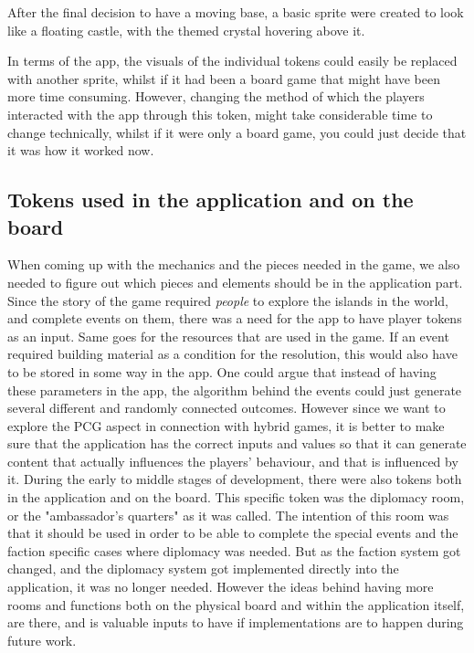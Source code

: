 After the final decision to have a moving base, a basic sprite were created to look like a floating castle, with the themed crystal hovering above it.

In terms of the app, the visuals of the individual tokens could easily be replaced with another sprite, whilst if it had been a board game that might have been more time consuming.
However, changing the method of which the players interacted with the app through this token, might take considerable time to change technically, whilst if it were only a board game, you could just decide that it was how it worked now.

\subsection{Tokens used in the application and on the board}
When coming up with the mechanics and the pieces needed in the game, we also needed to figure out which pieces and elements should be in the application part. Since the story of the game required \textit{people} to explore the islands in the world, and complete events on them, there was a need for the app to have player tokens as an input. Same goes for the resources that are used in the game. If an event required building material as a condition for the resolution, this would also have to be stored in some way in the app. One could argue that instead of having these parameters in the app, the algorithm behind the events could just generate several different and randomly connected outcomes. However since we want to explore the PCG aspect in connection with hybrid games, it is better to make sure that the application has the correct inputs and values so that it can generate content that actually influences the players' behaviour, and that is influenced by it.
During the early to middle stages of development, there were also tokens both in the application and on the board. This specific token was the diplomacy  room, or the "ambassador's quarters" as it was called. The intention of this room was that it should be used in order to be able to complete the special events and the faction specific cases where diplomacy was needed. But as the faction system got changed, and the diplomacy system got implemented directly into the application, it was no longer needed. However the ideas behind having more rooms and functions both on the physical board and within the application itself, are there, and is valuable inputs to have if implementations are to happen during future work.

